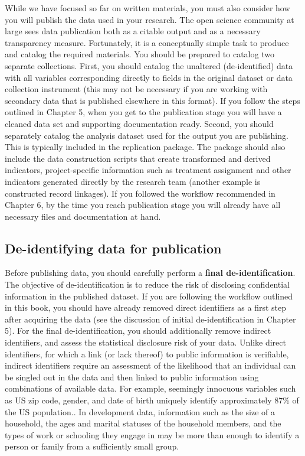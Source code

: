 While we have focused so far on written materials,
you must also consider how you will publish
the data used in your research.
The open science community at large sees data publication
both as a citable output and as a necessary transparency measure.
Fortunately, it is a conceptually simple task to produce
and catalog the required materials.
You should be prepared to catalog two separate collections.
First, you should catalog the unaltered (de-identified) data
with all variables corresponding directly
to fields in the original dataset or data collection instrument
(this may not be necessary if you are working with secondary data that is published elsewhere in this format).
If you follow the steps outlined in Chapter 5,
when you get to the publication stage you will have
a cleaned data set and supporting documentation ready.
Second, you should separately catalog
the analysis dataset used for the output you are publishing.
This is typically included in the replication package.
The package should also include the data construction scripts
that create transformed and derived indicators,
project-specific information
such as treatment assignment and other indicators
generated directly by the research team (another example is constructed record linkages).
If you followed the workflow recommended in Chapter 6,
by the time you reach publication stage you will already have all necessary
files and documentation at hand.

\subsection{De-identifying data for publication}

Before publishing data,
you should carefully perform a \textbf{final de-identification}.
The objective of de-identification is to reduce the risk of disclosing confidential information in the published dataset.
If you are following the workflow outlined in this book,
you should have already removed direct identifiers as a first step after acquiring the data
(see the discussion of initial de-identification in Chapter 5).
For the final de-identification, you should additionally remove
indirect identifiers, and assess the statistical disclosure risk of your data.
Unlike direct identifiers, for which a link (or lack thereof) to public information is verifiable,
indirect identifiers require an assessment of the likelihood
that an individual can be singled out in the data
and then linked to public information using combinations of available data.
For example, seemingly innocuous variables such as US zip code, 
gender, and date of birth uniquely identify 
approximately 87\% of the US population.\cite{Sweeney2000}. 
In development data, information such as the size of a household,
the ages and marital statuses of the household members,
and the types of work or schooling they engage in
may be more than enough to identify a person or family
from a sufficiently small group.

